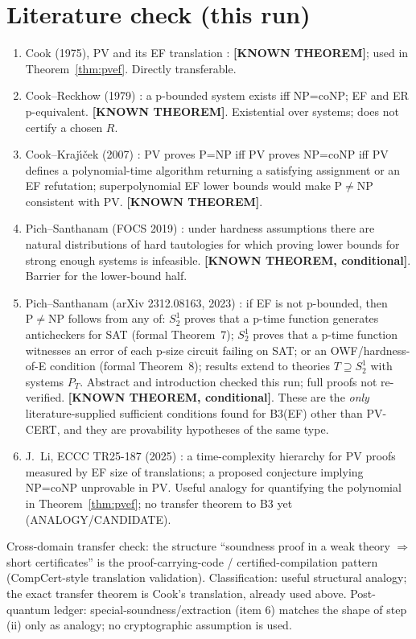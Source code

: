 \documentclass[11pt]{article}
\theoremstyle{remark}
\newcommand{\PV}{\mathrm{PV}}
\newcommand{\status}[1]{\textbf{[#1]}}
\begin{document}
\section{Literature check (this run)}
\begin{enumerate}
\item Cook (1975), PV and its EF translation \cite{cook75}: \status{KNOWN THEOREM}; used in
 Theorem~\ref{thm:pvef}. Directly transferable.
\item Cook--Reckhow (1979) \cite{cookreckhow79}: a p-bounded system exists iff NP=coNP; EF and ER
 p-equivalent. \status{KNOWN THEOREM}. Existential over systems; does not certify a chosen $R$.
\item Cook--Kraj\'{\i}\v{c}ek (2007) \cite{ck07}: $\PV$ proves P=NP iff $\PV$ proves NP=coNP iff $\PV$ defines a
 polynomial-time algorithm returning a satisfying assignment or an EF refutation; superpolynomial EF
 lower bounds would make $\mathrm P\ne\mathrm{NP}$ consistent with $\PV$. \status{KNOWN THEOREM}.
\item Pich--Santhanam (FOCS 2019) \cite{ps19}: under hardness assumptions there are natural
 distributions of hard tautologies for which proving lower bounds for strong enough systems is
 infeasible. \status{KNOWN THEOREM, conditional}. Barrier for the lower-bound half.
\item Pich--Santhanam (arXiv 2312.08163, 2023) \cite{ps23}: if EF is not p-bounded, then
 $\mathrm P\ne\mathrm{NP}$ follows from any of: $S^1_2$ proves that a p-time function generates
 anticheckers for SAT (formal Theorem~7); $S^1_2$ proves that a p-time function witnesses an error of
 each p-size circuit failing on SAT; or an OWF/hardness-of-E condition (formal Theorem~8); results
 extend to theories $T\supseteq S^1_2$ with systems $P_T$. Abstract and introduction checked this
 run; full proofs not re-verified. \status{KNOWN THEOREM, conditional}. These are the \emph{only}
 literature-supplied sufficient conditions found for B3(EF) other than PV-CERT, and they are
 provability hypotheses of the same type.
\item J.~Li, ECCC TR25-187 (2025) \cite{li25}: a time-complexity hierarchy for PV proofs measured by
 EF size of translations; a proposed conjecture implying NP=coNP unprovable in PV. Useful analogy for
 quantifying the polynomial in Theorem~\ref{thm:pvef}; no transfer theorem to B3 yet
 (ANALOGY/CANDIDATE).
\end{enumerate}
Cross-domain transfer check: the structure ``soundness proof in a weak theory $\Rightarrow$ short
certificates'' is the proof-carrying-code / certified-compilation pattern (CompCert-style translation
validation). Classification: useful structural analogy; the exact transfer theorem is Cook's
translation, already used above. Post-quantum ledger: special-soundness/extraction (item 6) matches
the shape of step (ii) only as analogy; no cryptographic assumption is used.
\end{document}
